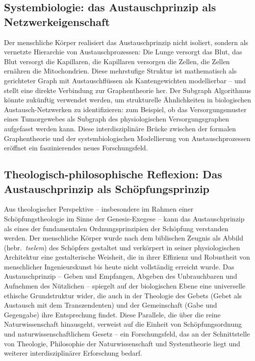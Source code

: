 ﻿\documentclass[a4paper,12pt]{article}
\theoremstyle{definition}
\begin{document}
\subsection{Systembiologie: das Austauschprinzip als Netzwerkeigenschaft}

Der menschliche Körper realisiert das Austauschprinzip nicht isoliert, sondern als
vernetzte Hierarchie von Austauschprozessen: Die Lunge versorgt das Blut, das Blut
versorgt die Kapillaren, die Kapillaren versorgen die Zellen, die Zellen ernähren
die Mitochondrien. Diese mehrstufige Struktur ist mathematisch als gerichteter Graph
mit Austauschflüssen als Kantengewichten modellierbar -- und stellt eine direkte
Verbindung zur Graphentheorie her. Der Subgraph Algorithmus \cite{epp2026subgraph}
könnte zukünftig verwendet werden, um strukturelle Ähnlichkeiten in biologischen
Austausch-Netzwerken zu identifizieren: zum Beispiel, ob das Versorgungsmuster eines
Tumorgewebes als Subgraph des physiologischen Versorgungsgraphen aufgefasst werden kann.
Diese interdisziplinäre Brücke zwischen der formalen Graphentheorie und der
systembiologischen Modellierung von Austauschprozessen eröffnet ein faszinierendes
neues Forschungsfeld.

\subsection{Theologisch-philosophische Reflexion: Das Austauschprinzip als Schöpfungsprinzip}

Aus theologischer Perspektive -- insbesondere im Rahmen einer Schöpfungstheologie
im Sinne der Genesis-Exegese -- kann das Austauschprinzip als eines der fundamentalen
Ordnungsprinzipien der Schöpfung verstanden werden. Der menschliche Körper wurde
nach dem biblischen Zeugnis als Abbild (hebr.\ \emph{tselem}) des Schöpfers gestaltet
und verkörpert in seiner physiologischen Architektur eine gestalterische Weisheit, die
in ihrer Effizienz und Robustheit von menschlicher Ingenieurskunst bis heute nicht
vollständig erreicht wurde. Das Austauschprinzip -- Geben und Empfangen, Abgeben des
Unbrauchbaren und Aufnehmen des Nützlichen -- spiegelt auf der biologischen Ebene
eine universelle ethische Grundstruktur wider, die auch in der Theologie des Gebets
(Gebet als Austausch mit dem Transzendenten) und der Gemeinschaft (Gabe und Gegengabe)
ihre Entsprechung findet. Diese Parallele, die über die reine Naturwissenschaft
hinausgeht, verweist auf die Einheit von Schöpfungsordnung und
naturwissenschaftlichem Gesetz -- ein Forschungsfeld, das an der Schnittstelle von
Theologie, Philosophie der Naturwissenschaft und Systemtheorie liegt und weiterer
interdisziplinärer Erforschung bedarf.
\end{document}
